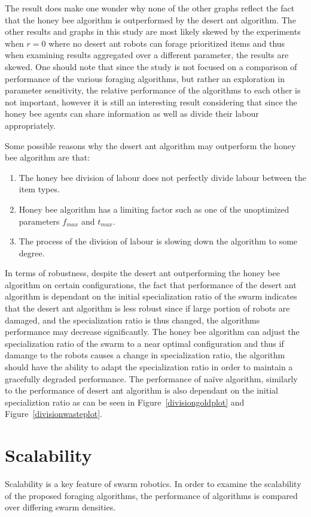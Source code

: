 The result does make one wonder why none of the other graphs reflect the fact that the honey bee algorithm is outperformed by the desert ant algorithm. The other results and graphs in this study are most likely skewed by the experiments when $r=0$ where no desert ant robots can forage prioritized items and thus when examining results aggregated over a different parameter, the results are skewed. One should note that since the study is not focused on a comparison of performance of the various foraging algorithms, but rather an exploration in parameter sensitivity, the relative performance of the algorithms to each other is not important, however it is still an interesting result considering that since the honey bee agents can share information as well as divide their labour appropriately. 
 
Some possible reasons why the desert ant algorithm may outperform the honey bee algorithm are that:
\begin{enumerate}
	\item The honey bee division of labour does not perfectly divide labour between the item types.
	\item Honey bee algorithm has a limiting factor such as one of the unoptimized parameters $f_{max}$ and $t_{max}$. 
	\item The process of the division of labour is slowing down the algorithm to some degree.
\end{enumerate}

In terms of robustness, despite the desert ant outperforming the honey bee algorithm on certain configurations, the fact that performance of the desert ant algorithm is dependant on the initial specialization ratio of the swarm indicates that the desert ant algorithm is less robust since if large portion of robots are damaged, and the specialization ratio is thus changed, the algorithms performance may decrease significantly. The honey bee algorithm can adjust the specialization ratio of the swarm to a near optimal configuration and thus if damange to the robots causes a change in specialization ratio, the algorithm should have the ability to adapt the specialization ratio in order to maintain a gracefully degraded performance. The performance of na\"ive algorithm, similarly to the performance of desert ant algorithm is also dependant on the initial specializtion ratio as can be seen in Figure~\ref{divisiongoldplot} and Figure~\ref{divisionwasteplot}. 

\section{Scalability}
\label{results:scability}
Scalability is a key feature of swarm robotics. In order to examine the scalability of the proposed foraging algorithms, the performance of algorithms is compared over differing swarm densities. 

